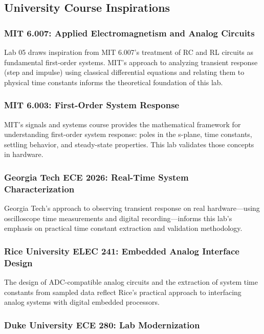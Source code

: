 \documentclass[11pt,letterpaper]{article}
\begin{document}
\subsection*{University Course Inspirations}

\subsubsection*{MIT 6.007: Applied Electromagnetism and Analog Circuits}

Lab 05 draws inspiration from MIT 6.007's treatment of RC and RL circuits as fundamental first-order systems. MIT's approach to analyzing transient response (step and impulse) using classical differential equations and relating them to physical time constants informs the theoretical foundation of this lab.

\subsubsection*{MIT 6.003: First-Order System Response}

MIT's signals and systems course provides the mathematical framework for understanding first-order system response: poles in the s-plane, time constants, settling behavior, and steady-state properties. This lab validates those concepts in hardware.

\subsubsection*{Georgia Tech ECE 2026: Real-Time System Characterization}

Georgia Tech's approach to observing transient response on real hardware—using oscilloscope time measurements and digital recording—informs this lab's emphasis on practical time constant extraction and validation methodology.

\subsubsection*{Rice University ELEC 241: Embedded Analog Interface Design}

The design of ADC-compatible analog circuits and the extraction of system time constants from sampled data reflect Rice's practical approach to interfacing analog systems with digital embedded processors.

\subsubsection*{Duke University ECE 280: Lab Modernization}
\end{document}
